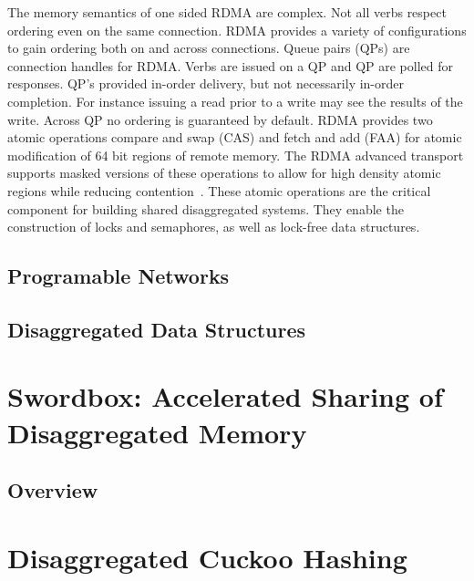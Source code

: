 \documentclass[12pt]{ucsddissertation}
\begin{document}
The memory semantics of one sided RDMA are complex. Not all verbs respect ordering even on the same
connection. RDMA provides a variety of configurations to gain ordering both on and across
connections. Queue pairs (QPs) are connection handles for RDMA. Verbs are issued on a QP and QP are
polled for responses. QP's provided in-order delivery, but not necessarily in-order completion. For
instance issuing a read prior to a write may see the results of the write. Across QP no ordering is
guaranteed by default. RDMA provides two atomic operations compare and swap (CAS) and fetch and add
(FAA) for atomic modification of 64 bit regions of remote memory. The RDMA advanced transport
supports masked versions of these operations to allow for high density atomic regions while reducing
contention~\cite{rdma-masked-cas}. These atomic operations are the critical component for building
shared disaggregated systems. They enable the construction of locks and semaphores, as well as
lock-free data structures.


\section{Programable Networks}

\section{Disaggregated Data Structures}



\chapter{Swordbox: Accelerated Sharing of Disaggregated Memory}









\section{Overview}



\chapter{Disaggregated Cuckoo Hashing}



%


%

\end{document}
